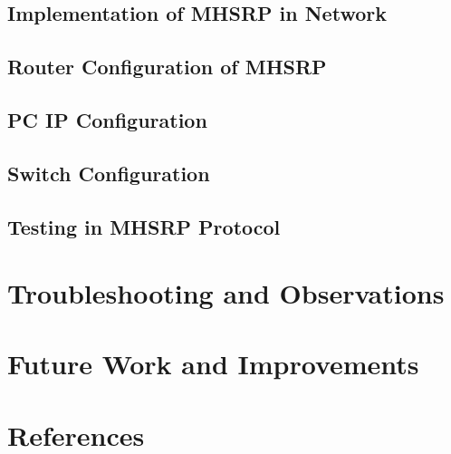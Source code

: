 \documentclass[12pt]{report}
\begin{document}
\section{Implementation of MHSRP in Network}
\section{Router Configuration of MHSRP}
\section{PC IP Configuration}
\section{Switch Configuration}
\section{Testing in MHSRP Protocol}
\chapter{Troubleshooting and Observations}
\chapter{Future Work and Improvements}
\chapter{References}
\end{document}
